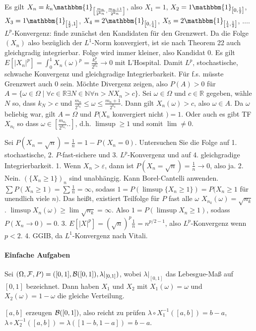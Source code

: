 \documentclass{article}
\begin{document}
Es gilt $X_n=k_n\mathbbm{1}_{\left[\frac{m_n}{2^{k_n}},\frac{m_n+1}{2^{k_n}}\right]}$, also $X_1=1$, $X_2=1\mathbbm{1}_{\left[0,\frac{1}{2}\right]}$, $X_3=1\mathbbm{1}_{\left[\frac{1}{2},1\right]}$, $X_4=2\mathbbm{1}_{\left[0,\frac{1}{4}\right]}$, $X_5=2\mathbbm{1}_{\left[\frac{1}{4},\frac{1}{2}\right]}$, $\dots$.
$L^p$-Konvergenz: finde zunächst den Kandidaten für den Grenzwert.
Da die Folge $(X_n)$ also bezüglich der $L^1$-Norm konvergiert, ist sie nach Theorem 22 auch gleichgradig integrierbar. Folge wird immer kleiner, also Kandidat 0.
Es gilt $E[|X_n|^p]=\int_0^1 X_n(\omega)^p=\frac{k_n^p}{2^{k_n}}\to0$ mit L'Hospital.
Damit $L^p$, stochastische, schwache Konvergenz und gleichgradige Integrierbarkeit.
Für f.s. müsste Grenzwert auch 0 sein.
Möchte Divergenz zeigen, also $P(A)>0$ für $A=\{\omega\in\Omega\mid\forall c\in\mathbb{R}\exists N\in\mathbb{N}\forall n>N X_n>c\}$.
Sei $\omega\in\Omega$ und $c\in\mathbb{R}$ gegeben, wähle $N$ so, dass $k_N>c$ und $\frac{m_n}{2^{k_n}}\leq\omega\leq\frac{m_n+1}{2^{k_n}}$.
Dann gilt $X_n(\omega)>c$, also $\omega\in A$.
Da $\omega$ beliebig war, gilt $A=\Omega$ und $P(X_n$ konvergiert nicht $)=1$.
Oder auch es gibt TF $X_{n_l}$ so dass $\omega\in[\frac{m_{n_l}}{2^{k_n_l}}..]$, d.h. $\limsup\geq1$ und somit $\lim\neq0$.

Sei $P(X_n=\sqrt{n})=\frac{1}{n}=1-P(X_n=0)$.
Untersuchen Sie die Folge auf 1. stochastische, 2. $P$-fast-sichere und 3. $L^p$-Konvergenz und auf 4. gleichgradige Integrierbarkeit.
1. Wenn $X_n>\varepsilon$, dann ist $P(X_n=\sqrt{n})=\frac{1}{n}\to0$, also ja.
2. Nein. $(\{X_n\geq1\})_n$ sind unabhängig. Kann Borel-Cantelli anwenden. $\sum P(X_n\geq 1)=\sum\frac{1}{n}=\infty$, sodass $1=P(\limsup\{X_n\geq1\})=P(X_n\geq1$ für unendlich viele $n)$.
Das heißt, existiert Teilfolge für $P$ fast alle $\omega$ $X_{n_k}(\omega)=\sqrt{n_k}$.
$\limsup X_n(\omega)\geq\lim\sqrt{n_k}=\infty$.
Also $1=P(\limsup X_n\geq1)$, sodass $P(X_n\to0)=0$.
3. $E[|X|^p]=(\sqrt{n})^p\frac{1}{n}=n^{p/2-1}$, also $L^p$-Konvergenz wenn $p<2$.
4. GGIB, da $L^1$-Konvergenz nach Vitali.

\paragraph{Einfache Aufgaben}
Sei $(\Omega,{\cal F},P)=([0,1],{\cal B}([0,1]),\lambda|_{[0,1]})$, wobei $\lambda|_{[0,1]}$ das Lebesgue-Maß auf $[0,1]$ bezeichnet.
Dann haben $X_1$ und $X_2$ mit $X_1(\omega)=\omega$ und $X_2(\omega)=1-\omega$ die gleiche Verteilung.

$[a,b]$ erzeugen ${\cal B}([0,1])$, also reicht zu prüfen $\lambda\circ X_1^{-1}([a,b])=b-a$, $\lambda\circ X_2^{-1}([a,b])=\lambda([1-b,1-a])=b-a$.
\end{document}
